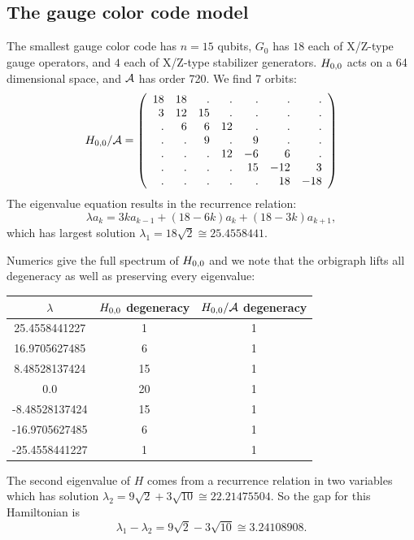 %

\subsection{The gauge color code model}
The smallest gauge color code has $n=15$ qubits,
$G_0$ has $18$ each of X/Z-type gauge operators,
and $4$ each of X/Z-type stabilizer generators.
$H_{0,0}$ acts on a 64 dimensional space, and $\mathcal{A}$ has
order 720. We find 7 orbits:
$$
H_{0,0}/\mathcal{A} = 
\left(\begin{array}{rrrrrrr}
18 & 18 &  . &  . &  . &  . &  . \cr
  3 & 12 & 15 &  . &  . &  . &  . \cr
  . &  6 &  6 & 12 &  . &  . &  . \cr
  . &  . &  9 &  . &  9 &  . &  . \cr
  . &  . &  . & 12 & -6 &  6 &  . \cr
  . &  . &  . &  . & 15 & -12 &  3 \cr
  . &  . &  . &  . &  . & 18 & -18
\end{array}\right)
$$
The eigenvalue equation results in
the recurrence relation:
$$
    \lambda a_k = 3ka_{k-1} + (18-6k)a_k + (18-3k)a_{k+1},
$$
which has largest solution 
$\lambda_1 = 18\sqrt{2} \cong 25.4558441.$


Numerics give the full spectrum of $H_{0,0}$ and we note that the orbigraph lifts
all degeneracy as well as preserving every eigenvalue:
\begin{center}
\begin{tabular}{ c|c|c } 
$\lambda$ & $H_{0,0}$ degeneracy & $H_{0,0}/\mathcal{A}$ degeneracy \\
\hline
    25.4558441227 & 1 & 1 \\
    16.9705627485 & 6 & 1 \\
    8.48528137424 & 15 & 1 \\
    0.0 & 20 & 1 \\
    -8.48528137424 & 15 & 1 \\
    -16.9705627485 & 6 & 1 \\
    -25.4558441227 & 1 & 1 \\
\end{tabular}
\end{center}

The second eigenvalue of $H$ comes from a recurrence
relation in two variables which has solution
$\lambda_2 = 9\sqrt{2} + 3\sqrt{10} \cong 22.21475504.$
So the gap for this Hamiltonian  is 
$$\lambda_1 - \lambda_2 = 9\sqrt{2} - 3\sqrt{10} \cong 3.24108908.$$



